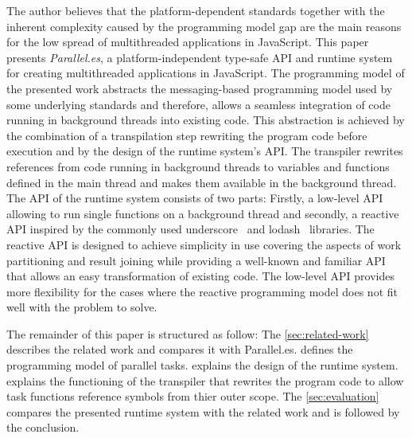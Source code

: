 The author believes that the platform-dependent standards together with the inherent complexity caused by the programming model gap are the main reasons for the low spread of multithreaded applications in JavaScript. This paper presents \textit{Parallel.es}, a platform-independent type-safe API and runtime system for creating multithreaded applications in JavaScript. The programming model of the presented work abstracts the messaging-based programming model used by some underlying standards and therefore, allows a seamless integration of code running in background threads into existing code. This abstraction is achieved by the combination of a transpilation step rewriting the program code before execution and by the design of the runtime system's API. The transpiler rewrites references from code running in background threads to variables and functions defined in the main thread and makes them available in the background thread. The API of the runtime system consists of two parts: Firstly, a low-level API allowing to run single functions on a background thread and secondly, a reactive API inspired by the commonly used underscore~\cite{underscorejs} and lodash~\cite{lodash} libraries. The reactive API is designed to achieve simplicity in use covering the aspects of work partitioning and result joining while providing a well-known and familiar API that allows an easy transformation of existing code. The low-level API provides more flexibility for the cases where the reactive programming model does not fit well with the problem to solve.

The remainder of this paper is structured as follow: The \cref{sec:related-work} describes the related work and compares it with Parallel.es.  defines the programming model of parallel tasks.  explains the design of the runtime system.  explains the functioning of the transpiler that rewrites the program code to allow task functions reference symbols from thier outer scope. The \cref{sec:evaluation} compares the presented runtime system with the related work and is followed by the conclusion. 
